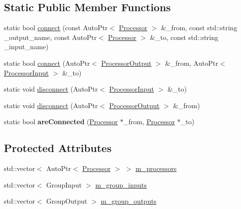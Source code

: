 \subsection*{Static Public Member Functions}
\begin{DoxyCompactItemize}
\item 
static bool \mbox{\hyperlink{class_chill_1_1_processing_graph_a5af6528fa4dd66f6c59dc6144a70d4c3}{connect}} (const Auto\+Ptr$<$ \mbox{\hyperlink{class_chill_1_1_processor}{Processor}} $>$ \&\+\_\+from, const std\+::string \+\_\+output\+\_\+name, const Auto\+Ptr$<$ \mbox{\hyperlink{class_chill_1_1_processor}{Processor}} $>$ \&\+\_\+to, const std\+::string \+\_\+input\+\_\+name)
\item 
static bool \mbox{\hyperlink{class_chill_1_1_processing_graph_a7f61e70c0b6e36b463108c78ab6ff82c}{connect}} (Auto\+Ptr$<$ \mbox{\hyperlink{class_chill_1_1_processor_output}{Processor\+Output}} $>$ \&\+\_\+from, Auto\+Ptr$<$ \mbox{\hyperlink{class_chill_1_1_processor_input}{Processor\+Input}} $>$ \&\+\_\+to)
\item 
static void \mbox{\hyperlink{class_chill_1_1_processing_graph_a9f3ccb8d44f098a9728059f839e86580}{disconnect}} (Auto\+Ptr$<$ \mbox{\hyperlink{class_chill_1_1_processor_input}{Processor\+Input}} $>$ \&\+\_\+to)
\item 
static void \mbox{\hyperlink{class_chill_1_1_processing_graph_a907f3d1f85ba8a59ecd5ab0aa8b353ee}{disconnect}} (Auto\+Ptr$<$ \mbox{\hyperlink{class_chill_1_1_processor_output}{Processor\+Output}} $>$ \&\+\_\+from)
\item 
\mbox{\label{class_chill_1_1_processing_graph_a9919fe8ff6b7229a77eb9060b0af2ebb}} 
static bool {\bfseries are\+Connected} (\mbox{\hyperlink{class_chill_1_1_processor}{Processor}} $\ast$\+\_\+from, \mbox{\hyperlink{class_chill_1_1_processor}{Processor}} $\ast$\+\_\+to)
\end{DoxyCompactItemize}
\subsection*{Protected Attributes}
\begin{DoxyCompactItemize}
\item 
std\+::vector$<$ Auto\+Ptr$<$ \mbox{\hyperlink{class_chill_1_1_processor}{Processor}} $>$ $>$ \mbox{\hyperlink{class_chill_1_1_processing_graph_a14b37b603b274ee9e74ccc2fecd61850}{m\+\_\+processors}}
\item 
std\+::vector$<$ Group\+Input $>$ \mbox{\hyperlink{class_chill_1_1_processing_graph_a45eaab4f6bbecd08837b4ef01f320719}{m\+\_\+group\+\_\+inputs}}
\item 
std\+::vector$<$ Group\+Output $>$ \mbox{\hyperlink{class_chill_1_1_processing_graph_af45053cb80e67bab58725bf2137e2d30}{m\+\_\+group\+\_\+outputs}}
\end{DoxyCompactItemize}
